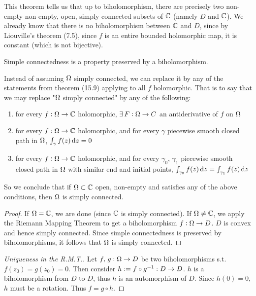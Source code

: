 \begin{remark}
This theorem tells us that up to biholomorphism, there are precisely two non-empty non-empty, open, simply connected subsets of $\mathbb{C}$ (namely $D$ and $\mathbb{C}$). We already know that there is no biholomorphism between $\mathbb{C}$ and $D$, since by Liouville's theorem (7.5), since $f$ is an entire bounded holomorphic map, it is constant (which is not bijective).
\end{remark}

\begin{note}

Simple connectedness is a property preserved by a biholomorphism.

\end{note}

\begin{remark}
Instead of assuming $\Omega$ simply connected, we can replace it by any of the statements from theorem (15.9) applying to all $f$ holomorphic. That is to say that we may replace "$\Omega$ simply connected" by any of the following:

\begin{enumerate}
    \item for every $f: \Omega \to \mathbb{C}$ holomorphic, $\exists \, F : \Omega \to C$ an antiderivative of $f$ on $\Omega$ 
    \item for every $f: \Omega \to \mathbb{C}$ holomorphic, and for every $\gamma$ piecewise smooth closed path in $\Omega$, $\int_\gamma f(z) \dif z = 0$
    \item for every $f: \Omega \to \mathbb{C}$ holomorphic, and for every $\gamma_0, \, \gamma_1$ piecewise smooth closed path in $\Omega$ with similar end and initial points, $\int_{\gamma_0} f(z) \dif z = \int_{\gamma_1} f(z) \dif z$
\end{enumerate}


So we conclude that if $\Omega \subset \mathbb{C}$ open, non-empty and satisfies any of the above conditions, then $\Omega$ is simply connected.\\


\begin{proof}
If $\Omega = \mathbb{C}$, we are done (since $\mathbb{C}$ is simply connected). If $\Omega \neq \mathbb{C}$, we apply the Riemann Mapping Theorem to get a biholomorphism $f: \Omega \to D$. $D$ is convex and hence simply connected. Since simple connectedness is preserved by biholomorphisms, it follows that $\Omega$ is simply connected.
\end{proof}



\end{remark}

\begin{proof}[Uniqueness in the R.M.T.]
Let $f, \, g : \Omega \to D$ be two biholomorphisms s.t. $f(z_0) = g(z_0) = 0$. Then consider $h \vcentcolon = f \circ g^{-1} : D \to D$. $h$ is a biholomorphism from $D$ to $D$, thus $h$ is an automorphism of $D$. Since $h(0) = 0$, $h$ must be a rotation. Thus $f = g \circ h$.
\end{proof}
